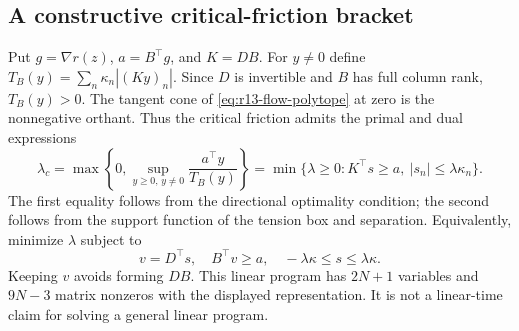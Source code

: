 \documentclass[11pt,letterpaper]{article}
\theoremstyle{definition}
\newcommand{\1}{\mathbf 1}
\begin{document}
\subsection{A constructive critical-friction bracket}\label{sec:r13-bracket}
Put $g=\nabla r(z)$, $a=B^\top g$, and $K=DB$. For $y\ne0$ define $T_B(y)=\sum_n\kappa_n|(Ky)_n|$. Since $D$ is invertible and $B$ has full column rank, $T_B(y)>0$. The tangent cone of \eqref{eq:r13-flow-polytope} at zero is the nonnegative orthant. Thus the critical friction admits the primal and dual expressions
\begin{equation}\label{eq:r13-critical}
 \lambda_c=\max\left\{0,\sup_{y\geq0,\,y\ne0}\frac{a^\top y}{T_B(y)}\right\}
 =\min\{\lambda\geq0:K^\top s\geq a,\ |s_n|\leq\lambda\kappa_n\}.
\end{equation}
The first equality follows from the directional optimality condition; the second follows from the support function of the tension box and separation. Equivalently, minimize $\lambda$ subject to
\[
 v=D^\top s,\quad B^\top v\geq a,\quad -\lambda\kappa\leq s\leq\lambda\kappa.
\]
Keeping $v$ avoids forming $DB$. This linear program has $2N+1$ variables and $9N-3$ matrix nonzeros with the displayed representation. It is not a linear-time claim for solving a general linear program.
\end{document}
